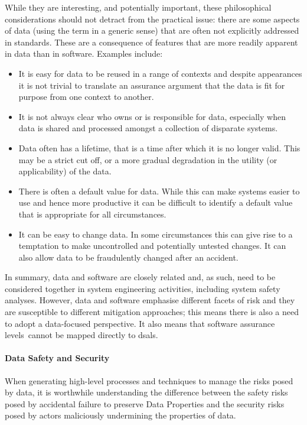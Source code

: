 While they are interesting, and potentially important, these philosophical considerations should not detract from the practical issue: there are some aspects of data (using the term in a generic sense) that are often not explicitly addressed in standards. These are a consequence of features that are more readily apparent in data than in software. Examples include:
\begin{itemize}
  \item It is easy for data to be reused in a range of contexts and despite appearances it is not trivial to translate an assurance argument that the data is fit for purpose from one context to another.
  \item It is not always clear who owns or is responsible for data, especially when data is shared and processed amongst a collection of disparate systems.
	\item Data often has a lifetime, that is a time after which it is no longer valid. This may be a strict cut off, or a more gradual degradation in the utility (or applicability) of the data.
  \item There is often a default value for data. While this can make systems easier to use and hence more productive it can be difficult to identify a default value that is appropriate for all circumstances.
  \item It can be easy to change data. In some circumstances this can give rise to a temptation to make uncontrolled and potentially untested changes. It can also allow data to be fraudulently changed after an accident.
\end{itemize}
In summary, data and software are closely related and, as such, need to be considered together in system engineering activities, including system safety analyses. However, data and software emphasise different facets of risk and they are susceptible to different mitigation approaches; this means there is also a need to adopt a data-focused perspective. It also means that \cbstart{}\glspl{software assurance level}\cbend\ cannot be mapped directly to \glspl{dsal}.

\paragraph{Data Safety and Security}
When generating high-level processes and techniques to manage the risks posed by data, it is worthwhile understanding the difference between the safety risks posed by accidental failure to preserve Data Properties and the security risks posed by actors maliciously undermining the properties of data.


